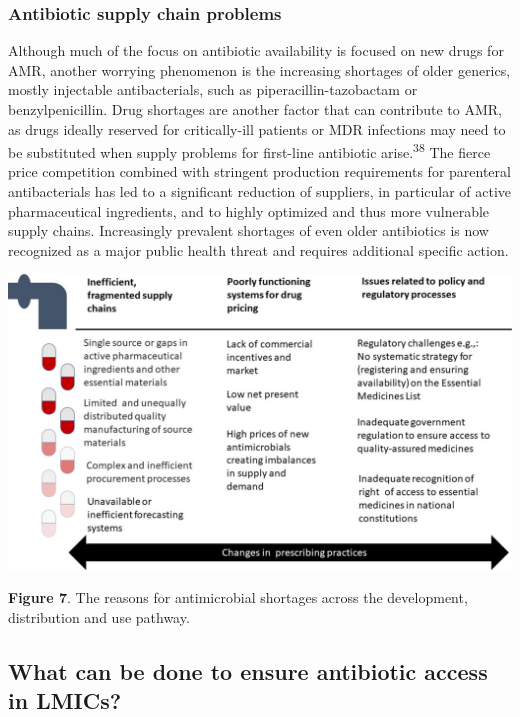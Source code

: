 \documentclass[
  11pt,
  paper=a4,
  ,captions=tableheading
]{scrartcl}
\begin{document}
\hypertarget{antibiotic-supply-chain-problems}{%
\subsubsection*{Antibiotic supply chain
problems}\label{antibiotic-supply-chain-problems}}

Although much of the focus on antibiotic availability is focused on new
drugs for AMR, another worrying phenomenon is the increasing shortages
of older generics, mostly injectable antibacterials, such as
piperacillin-tazobactam or benzylpenicillin. Drug shortages are another
factor that can contribute to AMR, as drugs ideally reserved for
critically-ill patients or MDR infections may need to be substituted
when supply problems for first-line antibiotic
arise.\textsuperscript{38} The fierce price competition combined with
stringent production requirements for parenteral antibacterials has led
to a significant reduction of suppliers, in particular of active
pharmaceutical ingredients, and to highly optimized and thus more
vulnerable supply chains. Increasingly prevalent shortages of even older
antibiotics is now recognized as a major public health threat and
requires additional specific action.

\includegraphics[width=6.25in,height=\textheight]{images/drugshortages.jpg}

\textbf{Figure 7}. The reasons for antimicrobial shortages across the
development, distribution and use pathway.

\hypertarget{what-can-be-done-to-ensure-antibiotic-access-in-lmics}{%
\subsection*{What can be done to ensure antibiotic access in
LMICs?}\label{what-can-be-done-to-ensure-antibiotic-access-in-lmics}}
\end{document}

